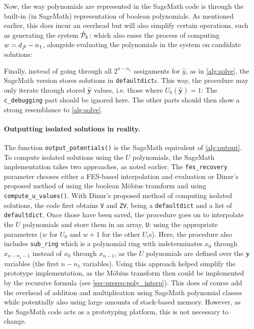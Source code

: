Now, the way polynomials are represented in the SageMath code is through the built-in (in SageMath) representation of boolean polynomials. As mentioned earlier, this does incur an overhead but will also simplify certain operations, such as generating the system $\Tilde{\mathcal{P}}_k$:
which also eases the process of computing $w = d_{\Tilde{\mathcal{F}}} - n_1$,
alongside evaluating the polynomials in the system on candidate solutions:

Finally, instead of going through all $2^{n - n_1}$ assignments for $\hat{y}$, as in \cref{alg:solve}, the SageMath version stores solutions in \texttt{defaultdict}s. This way, the procedure may only iterate through stored $\hat{\mathbf{y}}$ values, i.e. those where $U_0(\hat{\mathbf{y}}) = 1$:
The \texttt{c\_debugging} part should be ignored here. The other parts should then show a strong resemblance to \cref{alg:solve}.

\paragraph{Outputting isolated solutions in reality.} The function \texttt{output\_potentials()} is the SageMath equivalent of \cref{alg:output}. To compute isolated solutions using the $U$ polynomials, the SageMath implementation takes two approaches, as noted earlier. The \texttt{fes\_recovery} parameter chooses either a FES-based interpolation and evaluation or Dinur's proposed method of using the boolean Möbius transform and using \texttt{compute\_u\_values()}. With Dinur's proposed method of computing isolated solutions, the code first obtains \texttt{V} and \texttt{ZV}, being a \texttt{defaultdict} and a list of \texttt{defaultdict}. Once those have been saved, the procedure goes on to interpolate the $U$ polynomials and store them in an array, \texttt{U}:
using the appropriate parameters ($w$ for $U_0$ and $w + 1$ for the other $U_i$s). Here, the procedure also includes \texttt{sub\_ring} which is a polynomial ring with indeterminates $x_0$ through $x_{n - n_1 - 1}$ instead of $x_0$ through $x_{n - 1}$, as the $U$ polynomials are defined over the $\mathbf{y}$ variables (the first $n - n_1$ variables). Using this approach helped simplify the prototype implementation, as the Möbius transform then could be implemented by the recursive formula (see \cref{sec:prereq:poly_interp}). This does of course add the overhead of addition and multiplication using SageMath polynomial classes while potentially also using large amounts of stack-based memory. However, as the SageMath code acts as a prototyping platform, this is not necessary to change.

